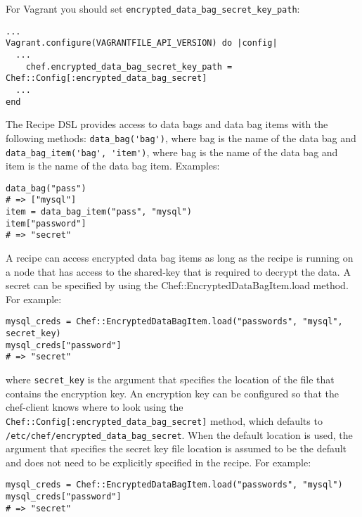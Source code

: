 For Vagrant you should set \lstinline!encrypted_data_bag_secret_key_path!:

\begin{lstlisting}[label=lst:my-cloud-chef-databag12,title=my-cloud/Vagrantfile]
...
Vagrant.configure(VAGRANTFILE_API_VERSION) do |config|
  ...
    chef.encrypted_data_bag_secret_key_path = Chef::Config[:encrypted_data_bag_secret]
  ...
end
\end{lstlisting}

The Recipe DSL provides access to data bags and data bag items with the following methods: \lstinline!data_bag('bag')!, where bag is the name of the data bag and \lstinline!data_bag_item('bag', 'item')!, where bag is the name of the data bag and item is the name of the data bag item. Examples:

\begin{lstlisting}[label=lst:my-cloud-chef-databag13]
data_bag("pass")
# => ["mysql"]
item = data_bag_item("pass", "mysql")
item["password"]
# => "secret"
\end{lstlisting}

A recipe can access encrypted data bag items as long as the recipe is running on a node that has access to the shared-key that is required to decrypt the data. A secret can be specified by using the Chef::EncryptedDataBagItem.load method. For example:

\begin{lstlisting}[label=lst:my-cloud-chef-databag14]
mysql_creds = Chef::EncryptedDataBagItem.load("passwords", "mysql", secret_key)
mysql_creds["password"]
# => "secret"
\end{lstlisting}

where \lstinline!secret_key! is the argument that specifies the location of the file that contains the encryption key. An encryption key can be configured so that the chef-client knows where to look using the \lstinline!Chef::Config[:encrypted_data_bag_secret]! method, which defaults to \lstinline!/etc/chef/encrypted_data_bag_secret!. When the default location is used, the argument that specifies the secret key file location is assumed to be the default and does not need to be explicitly specified in the recipe. For example:

\begin{lstlisting}[label=lst:my-cloud-chef-databag15]
mysql_creds = Chef::EncryptedDataBagItem.load("passwords", "mysql")
mysql_creds["password"]
# => "secret"
\end{lstlisting}

